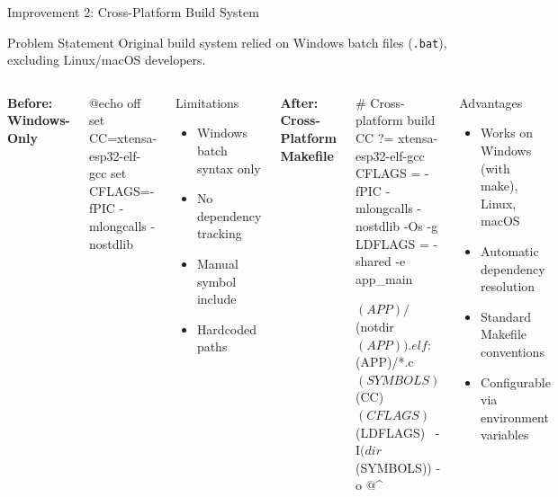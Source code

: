 \documentclass[aspectratio=169, 10pt]{beamer}
\begin{document}
\begin{frame}{Improvement 2: Cross-Platform Build System}
    \begin{block}{Problem Statement}
        Original build system relied on Windows batch files (\texttt{.bat}), excluding Linux/macOS developers.
    \end{block}

    \vspace{0.2cm}
    \begin{columns}[T]
        \centering
        \textbf{Before: Windows-Only}
        \vspace{0.1cm}
        \begin{ccode}
@echo off
set CC=xtensa-esp32-elf-gcc
set CFLAGS=-fPIC -mlongcalls -nostdlib
        \end{ccode}
        \vspace{0.2cm}
        \begin{alertblock}{Limitations}
            \begin{itemize}\setlength{\itemsep}{2pt}
                \item Windows batch syntax only
                \item No dependency tracking
                \item Manual symbol include
                \item Hardcoded paths
            \end{itemize}
        \end{alertblock}

        \centering
        \textbf{After: Cross-Platform Makefile}
        \vspace{0.1cm}
        \begin{ccode}
# Cross-platform build
CC ?= xtensa-esp32-elf-gcc
CFLAGS = -fPIC -mlongcalls -nostdlib -Os -g
LDFLAGS = -shared -e app_main

$(APP)/$(notdir $(APP)).elf: \
    $(APP)/*.c $(SYMBOLS)
	$(CC) $(CFLAGS) $(LDFLAGS) \
            -I$(dir $(SYMBOLS)) -o $@ $^
        \end{ccode}
        \vspace{0.2cm}
        \begin{exampleblock}{Advantages}
            \begin{itemize}\setlength{\itemsep}{2pt}
                \item Works on Windows (with make), Linux, macOS
                \item Automatic dependency resolution
                \item Standard Makefile conventions
                \item Configurable via environment variables
            \end{itemize}
        \end{exampleblock}
    \end{columns}


\end{frame}
\end{document}
